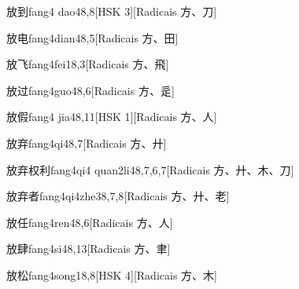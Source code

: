\begin{entry}{放到}{fang4 dao4}{8,8}[HSK 3][Radicais ⽅、⼑]
\end{entry}

\begin{entry}{放电}{fang4dian4}{8,5}[Radicais ⽅、⽥]
\end{entry}

\begin{entry}{放飞}{fang4fei1}{8,3}[Radicais ⽅、⾶]
\end{entry}

\begin{entry}{放过}{fang4guo4}{8,6}[Radicais ⽅、⾡]
\end{entry}

\begin{entry}{放假}{fang4 jia4}{8,11}[HSK 1][Radicais ⽅、⼈]
\end{entry}

\begin{entry}{放弃}{fang4qi4}{8,7}[Radicais ⽅、⼶]
\end{entry}

\begin{entry}{放弃权利}{fang4qi4 quan2li4}{8,7,6,7}[Radicais ⽅、⼶、⽊、⼑]
\end{entry}

\begin{entry}{放弃者}{fang4qi4zhe3}{8,7,8}[Radicais ⽅、⼶、⽼]
\end{entry}

\begin{entry}{放任}{fang4ren4}{8,6}[Radicais ⽅、⼈]
\end{entry}

\begin{entry}{放肆}{fang4si4}{8,13}[Radicais ⽅、⾀]
\end{entry}

\begin{entry}{放松}{fang4song1}{8,8}[HSK 4][Radicais ⽅、⽊]
\end{entry}

